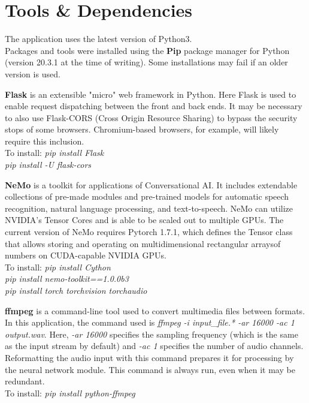 \documentclass[12pt, letterpaper]{article}
\begin{document}
\section*{Tools \& Dependencies} \label{tools}
The application uses the latest version of Python3.\\
Packages and tools were installed using the \textbf{Pip} package manager for Python (version 20.3.1 at the time of writing). Some installations may fail if an older version is used.

\textbf{Flask} is an extensible "micro" web framework in Python. Here Flask is used to enable request dispatching between the front and back ends. It may be necessary to also use Flask-CORS (Cross Origin Resource Sharing) to bypass the security stops of some browsers. Chromium-based browsers, for example, will likely require this inclusion.
\\To install: \textit{pip install Flask}
\\\hspace*{19mm} \textit{pip install -U flask-cors}

\textbf{NeMo} is a toolkit for applications of Conversational AI. It includes extendable collections of pre-made modules and pre-trained models for automatic speech recognition, natural language processing, and text-to-speech. NeMo can utilize NVIDIA's Tensor Cores and is able to be scaled out to multiple GPUs. The current version of NeMo requires Pytorch 1.7.1, which defines the Tensor class that allows storing and operating on multidimensional rectangular arraysof numbers on CUDA-capable NVIDIA GPUs.
\\To install: \textit{pip install Cython}
\\\hspace*{19mm} \textit{pip install nemo-toolkit==1.0.0b3}
\\\hspace*{19mm} \textit{pip install torch torchvision torchaudio}

\textbf{ffmpeg} is a command-line tool used to convert multimedia files between formats. In this application, the command used is \textit{ffmpeg -i input\_file.* -ar 16000 -ac 1 output.wav}. Here, \textit{-ar 16000} specifies the sampling frequency (which is the same as the input stream by default) and \textit{-ac 1} specifies the number of audio channels. Reformatting the audio input with this command prepares it for processing by the neural network module. This command is always run, even when it may be redundant.
\\To install: \textit{pip install python-ffmpeg}
\end{document}

